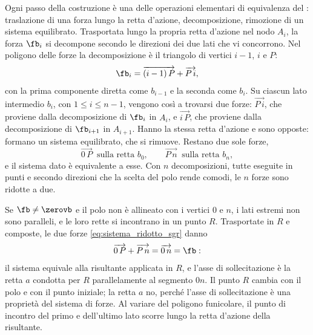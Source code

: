Ogni passo della costruzione è una delle operazioni elementari di equivalenza del
: traslazione di una forza lungo la retta d'azione, decomposizione,
rimozione di un sistema equilibrato. Trasportata lungo la propria retta d'azione nel nodo $A_i$,
la forza $\fb_i$ si decompone secondo le direzioni dei due lati che vi concorrono. Nel poligono
delle forze la decomposizione è il triangolo di vertici $i-1$, $i$ e $P$:
\begin{equation}
	\fb_i = \overrightarrow{(i-1)\,P} + \overrightarrow{P\,i} ,
	\label{eq:decomposizione_sgr}
\end{equation}
con la prima componente diretta come $b_{i-1}$ e la seconda come $b_i$. Su ciascun lato intermedio
$b_i$, con $1 \le i \le n-1$, vengono così a trovarsi due forze: $\overrightarrow{P\,i}$, che
proviene dalla decomposizione di $\fb_i$ in $A_i$, e $\overrightarrow{i\,P}$, che proviene dalla
decomposizione di $\fb_{i+1}$ in $A_{i+1}$. Hanno la stessa retta d'azione e sono opposte:
formano un sistema equilibrato, che si rimuove. Restano due sole forze,
\begin{equation}
	\overrightarrow{0\,P} \ \text{ sulla retta } b_0 , \qquad
	\overrightarrow{P\,n} \ \text{ sulla retta } b_n ,
	\label{eq:sistema_ridotto_sgr}
\end{equation}
e il sistema dato è equivalente a esse. Con $n$ decomposizioni, tutte eseguite in punti e secondo
direzioni che la scelta del polo rende comodi, le $n$ forze sono ridotte a due.

Se $\fb \neq \zerovb$ e il polo non è allineato con i vertici $0$ e $n$, i lati estremi non sono
paralleli, e le loro rette si incontrano in un punto $R$. Trasportate in $R$ e composte, le due
forze \eqref{eq:sistema_ridotto_sgr} danno
\begin{equation}
	\overrightarrow{0\,P} + \overrightarrow{P\,n} = \overrightarrow{0\,n} = \fb :
	\label{eq:composizione_sgr}
\end{equation}
il sistema equivale alla risultante applicata in $R$, e l'asse di sollecitazione è la retta $a$
condotta per $R$ parallelamente al segmento $0n$. Il punto $R$ cambia con il polo e con il punto
iniziale; la retta $a$ no, perché l'asse di sollecitazione è una proprietà del sistema di forze.
Al variare del poligono funicolare, il punto di incontro del primo e dell'ultimo lato scorre lungo
la retta d'azione della risultante.

